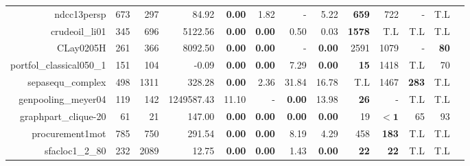 \begin{landscape}
\begin{table*}[t]
\begin{tabular}{|r|r|r||r||r|r|r|r||r|r|r|r|r|}
                         ndcc13persp &           673 &           297 &                             84.92 &  \textbf{0.00} &           1.82 &              - &           5.22 &       \textbf{659} &                722 &                  - &                T.L \\ 
                      crudeoil\_li01 &           345 &           696 &                           5122.56 &  \textbf{0.00} &  \textbf{0.00} &           0.50 &           0.03 &      \textbf{1578} &                T.L &                T.L &                T.L \\ 
                           CLay0205H &           261 &           366 &                           8092.50 &  \textbf{0.00} &  \textbf{0.00} &              - &  \textbf{0.00} &               2591 &               1079 &                  - &        \textbf{80} \\ 
            portfol\_classical050\_1 &           151 &           104 &                             -0.09 &  \textbf{0.00} &  \textbf{0.00} &           7.29 &  \textbf{0.00} &        \textbf{15} &               1418 &                T.L &                 70 \\ 
                   sepasequ\_complex &           498 &          1311 &                            328.28 &  \textbf{0.00} &           2.36 &          31.84 &          16.78 &                T.L &               1467 &       \textbf{283} &                T.L \\ 
                 genpooling\_meyer04 &           119 &           142 &                        1249587.43 &          11.10 &              - &  \textbf{0.00} &          13.98 &        \textbf{26} &                  - &                T.L &                T.L \\ 
                graphpart\_clique-20 &            61 &            21 &                            147.00 &  \textbf{0.00} &  \textbf{0.00} &  \textbf{0.00} &  \textbf{0.00} &                 19 &         $\bm{< 1}$ &                 65 &                 93 \\ 
                     procurement1mot &           785 &           750 &                            291.54 &  \textbf{0.00} &  \textbf{0.00} &           8.19 &           4.29 &                458 &       \textbf{183} &                T.L &                T.L \\ 
                     sfacloc1\_2\_80 &           232 &          2089 &                             12.75 &  \textbf{0.00} &  \textbf{0.00} &           1.43 &  \textbf{0.00} &        \textbf{22} &        \textbf{22} &                T.L &                T.L \\ 

\end{tabular}
\end{table*}
\end{landscape}
